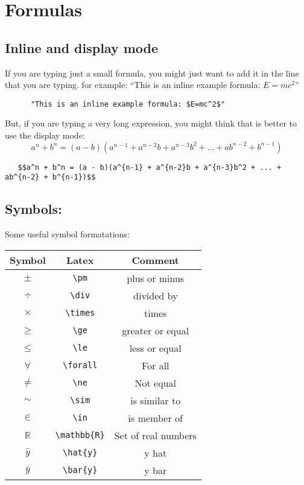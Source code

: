 \documentclass[]{article}
\begin{document}
\section{Formulas}\label{formulas}

\subsection{Inline and display mode}\label{inline-and-display-mode}

If you are typing just a small formula, you might just want to add it in
the line that you are typing. for example: ``This is an inline example
formula: \(E=mc^2\)''

\begin{verbatim}
      "This is an inline example formula: $E=mc^2$"
\end{verbatim}

But, if you are typing a very long expression, you might think that is
better to use the display mode:
\[a^n + b^n = (a - b)(a^{n-1} + a^{n-2}b + a^{n-3}b^2 + ... + ab^{n-2} + b^{n-1})\]

\begin{verbatim}
   $$a^n + b^n = (a - b)(a^{n-1} + a^{n-2}b + a^{n-3}b^2 + ... + ab^{n-2} + b^{n-1})$$
\end{verbatim}

\subsection{Symbols:}\label{symbols}

Some useful symbol formatations:

\begin{longtable}[]{@{}ccc@{}}
\toprule
Symbol & Latex & Comment\tabularnewline
\midrule
\endhead
\(\pm\) & \texttt{\textbackslash{}pm} & plus or minus\tabularnewline
\(\div\) & \texttt{\textbackslash{}div} & divided by\tabularnewline
\(\times\) & \texttt{\textbackslash{}times} & times\tabularnewline
\(\ge\) & \texttt{\textbackslash{}ge} & greater or equal\tabularnewline
\(\le\) & \texttt{\textbackslash{}le} & less or equal\tabularnewline
\(\forall\) & \texttt{\textbackslash{}forall} & For all\tabularnewline
\(\ne\) & \texttt{\textbackslash{}ne} & Not equal\tabularnewline
\(\sim\) & \texttt{\textbackslash{}sim} & is similar to\tabularnewline
\(\in\) & \texttt{\textbackslash{}in} & is member of\tabularnewline
\(\mathbb{R}\) & \texttt{\textbackslash{}mathbb\{R\}} & Set of real
numbers\tabularnewline
\(\hat{y}\) & \texttt{\textbackslash{}hat\{y\}} & y hat\tabularnewline
\(\bar{y}\) & \texttt{\textbackslash{}bar\{y\}} & y bar\tabularnewline
\bottomrule
\end{longtable}
\end{document}
